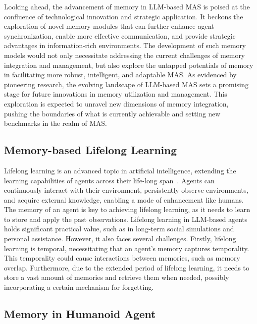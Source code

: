 \documentclass{article}
\theoremstyle{definition}
\theoremstyle{theorem}
\theoremstyle{proof}
\theoremstyle{remark}
\begin{document}
	Looking ahead, the advancement of memory in LLM-based MAS is poised at the confluence of technological innovation and strategic application. It beckons the exploration of novel memory modules that can further enhance agent synchronization, enable more effective communication, and provide strategic advantages in information-rich environments. The development of such memory models would not only necessitate addressing the current challenges of memory integration and management, but also explore the untapped potentials of memory in facilitating more robust, intelligent, and adaptable MAS. As evidenced by pioneering research, the evolving landscape of LLM-based MAS sets a promising stage for future innovations in memory utilization and management. This exploration is expected to unravel new dimensions of memory integration, pushing the boundaries of what is currently achievable and setting new benchmarks in the realm of MAS.
	
	\subsection{Memory-based Lifelong Learning}
	Lifelong learning is an advanced topic in artificial intelligence, extending the learning capabilities of agents across their life-long span~\cite{survey_life_long_learning}. Agents can continuously interact with their environment, persistently observe environments, and acquire external knowledge, enabling a mode of enhancement like humans. The memory of an agent is key to achieving lifelong learning, as it needs to learn to store and apply the past observations. Lifelong learning in LLM-based agents holds significant practical value, such as in long-term social simulations and personal assistance. However, it also faces several challenges. Firstly, lifelong learning is temporal, necessitating that an agent's memory captures temporality. This temporality could cause interactions between memories, such as memory overlap. Furthermore, due to the extended period of lifelong learning, it needs to store a vast amount of memories and retrieve them when needed, possibly incorporating a certain mechanism for forgetting.
	
	\subsection{Memory in Humanoid Agent}
	
\end{document}
